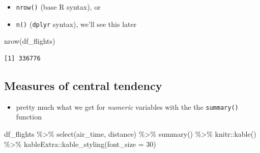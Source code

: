 \documentclass[
  letterpaper,
  DIV=11]{scrartcl}
\newenvironment{Shaded}{\begin{snugshade}}{\end{snugshade}}
\newcommand{\AttributeTok}[1]{\textcolor[rgb]{0.40,0.45,0.13}{#1}}
\newcommand{\DecValTok}[1]{\textcolor[rgb]{0.68,0.00,0.00}{#1}}
\newcommand{\FunctionTok}[1]{\textcolor[rgb]{0.28,0.35,0.67}{#1}}
\newcommand{\NormalTok}[1]{\textcolor[rgb]{0.00,0.23,0.31}{#1}}
\newcommand{\SpecialCharTok}[1]{\textcolor[rgb]{0.37,0.37,0.37}{#1}}
\providecommand{\tightlist}{%
  \setlength{\itemsep}{0pt}\setlength{\parskip}{0pt}}\usepackage{longtable,booktabs,array}
\begin{document}
\begin{tcolorbox}
\begin{itemize}
  \begin{itemize}
  \tightlist
  \item
    \texttt{nrow()} (base R syntax), or
  \item
    \texttt{n()} (\texttt{dplyr} syntax), we'll see this later
  \end{itemize}
\end{itemize}

\begin{Shaded}
\begin{Highlighting}[]
\FunctionTok{nrow}\NormalTok{(df\_flights)}
\end{Highlighting}
\end{Shaded}

\begin{verbatim}
[1] 336776
\end{verbatim}

\end{tcolorbox}

\hypertarget{measures-of-central-tendency}{%
\subsection{Measures of central
tendency}\label{measures-of-central-tendency}}

\begin{itemize}
\tightlist
\item
  pretty much what we get for \emph{numeric} variables with the the
  \texttt{summary()} function
\end{itemize}

\begin{Shaded}
\begin{Highlighting}[]
\NormalTok{df\_flights }\SpecialCharTok{\%\textgreater{}\%} 
  \FunctionTok{select}\NormalTok{(air\_time, distance) }\SpecialCharTok{\%\textgreater{}\%} 
  \FunctionTok{summary}\NormalTok{() }\SpecialCharTok{\%\textgreater{}\%} 
\NormalTok{  knitr}\SpecialCharTok{::}\FunctionTok{kable}\NormalTok{() }\SpecialCharTok{\%\textgreater{}\%} 
\NormalTok{  kableExtra}\SpecialCharTok{::}\FunctionTok{kable\_styling}\NormalTok{(}\AttributeTok{font\_size =} \DecValTok{30}\NormalTok{)}
\end{Highlighting}
\end{Shaded}
\end{document}

